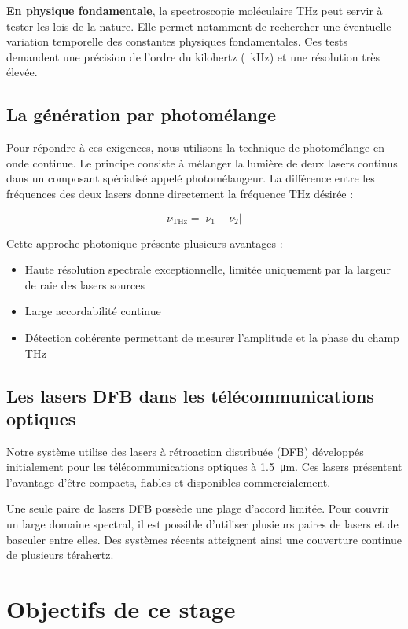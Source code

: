 \textbf{En physique fondamentale}, la spectroscopie moléculaire THz peut servir à tester les lois de la nature. Elle permet notamment de rechercher une éventuelle variation temporelle des constantes physiques fondamentales. Ces tests demandent une précision de l'ordre du kilohertz (\SI{}{\kilo\hertz}) et une résolution très élevée.

\subsection{La génération par photomélange}

Pour répondre à ces exigences, nous utilisons la technique de photomélange en onde continue. Le principe consiste à mélanger la lumière de deux lasers continus dans un composant spécialisé appelé photomélangeur. La différence entre les fréquences des deux lasers donne directement la fréquence THz désirée :

\begin{equation}
\nu_{\text{THz}} = |\nu_{1} - \nu_{2}|
\end{equation}

Cette approche photonique présente plusieurs avantages :
\begin{itemize}
    \item Haute résolution spectrale exceptionnelle, limitée uniquement par la largeur de raie des lasers sources
    \item Large accordabilité continue
    \item Détection cohérente permettant de mesurer l'amplitude et la phase du champ THz
\end{itemize}

\subsection{Les lasers DFB dans les télécommunications optiques}

Notre système utilise des lasers à rétroaction distribuée (DFB) développés initialement pour les télécommunications optiques à \SI{1,5}{\micro\meter}. Ces lasers présentent l'avantage d'être compacts, fiables et disponibles commercialement.

Une seule paire de lasers DFB possède une plage d'accord limitée. Pour couvrir un large domaine spectral, il est possible d'utiliser plusieurs paires de lasers et de basculer entre elles. Des systèmes récents atteignent ainsi une couverture continue de plusieurs térahertz.

\section{Objectifs de ce stage}


